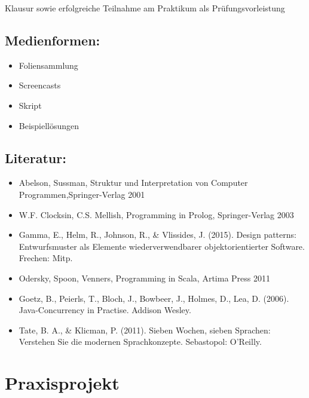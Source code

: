 Klausur sowie erfolgreiche Teilnahme am Praktikum als
Prüfungsvorleistung

\section*{Medienformen:}\label{medienformen-10}

\begin{itemize}
\tightlist
\item
  Foliensammlung
\item
  Screencasts
\item
  Skript
\item
  Beispiellösungen
\end{itemize}

\section*{Literatur:}\label{literatur-14}

\begin{itemize}
\tightlist
\item
  Abelson, Sussman, Struktur und Interpretation von Computer
  Programmen,Springer-Verlag 2001
\item
  W.F. Clocksin, C.S. Mellish, Programming in Prolog, Springer-Verlag
  2003
\item
  Gamma, E., Helm, R., Johnson, R., \& Vlissides, J. (2015). Design
  patterns: Entwurfsmuster als Elemente wiederverwendbarer
  objektorientierter Software. Frechen: Mitp.
\item
  Odersky, Spoon, Venners, Programming in Scala, Artima Press 2011
\item
  Goetz, B., Peierls, T., Bloch, J., Bowbeer, J., Holmes, D., Lea, D.
  (2006). Java-Concurrency in Practise. Addison Wesley.
\item
  Tate, B. A., \& Klicman, P. (2011). Sieben Wochen, sieben Sprachen:
  Verstehen Sie die modernen Sprachkonzepte. Sebastopol: O'Reilly.
\end{itemize}

\chapter{Praxisprojekt}\label{praxisprojekt}

